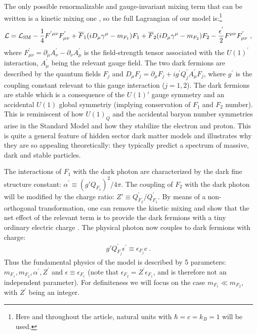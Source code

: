 \documentclass[12pt]{article}
\begin{document}
The only possible renormalizable and gauge-invariant mixing term that can be written is a kinetic mixing one \cite{foothe}, so the full Lagrangian of our model is:\footnote{Here and throughout the article, natural units with $\hbar = c = k _B = 1$ will be used.}
%
\begin{eqnarray}
{\cal L} = {\cal L} _{\text{SM}} -\frac{1}{4}F ^{'\mu \nu} F _{\mu \nu} ^{'} + \overline{F} _1(iD _{\mu}\gamma ^{\mu} - m _{F_1})F _1 + \overline{F} _2(iD _{\mu}\gamma ^{\mu} - m _{F_2})F _2 - \frac{\epsilon ^{'}}{2}F ^{\mu \nu} F _{\mu \nu} ^{'} \ ,
\end{eqnarray}
%
where $F _{\mu \nu} ^{'} = \partial _{\mu} A _{\nu} ^{'} - \partial _{\nu} A _{\mu} ^{'}$ is the field-strength tensor associated with the $U(1) ^{'}$ interaction, $A _{\mu} ^{'}$ being the relevant gauge field. The two dark fermions are described by the quantum fields $F_j$ and $D _{\mu}F _j = \partial _{\mu}F _j + ig ^{'}Q _{j} ^{'} A _{\mu} ^{'}F _j$, where $g ^{'}$ is the coupling constant relevant to this gauge interaction ($j=1,2$). The dark fermions are stable which is a consequence of the $U(1)'$
gauge symmetry and an accidental $U(1)$ global symmetriy  (implying conservation of $F_1$ and $F_2$ number). This is reminiscent of how $U(1)_Q$ and the accidental baryon number  symmetries arise in the Standard Model and how they stabilize the electron and proton. This is quite a general feature of hidden sector dark matter models and illustrates why they are so appealing theoretically: they typically predict a spectrum of massive, dark and stable particles.

The interactions of $F _1$ with the dark photon are characterized by the dark fine structure constant: $\alpha ^{'} \equiv (g'Q _{F_1}) ^2/4\pi$. The coupling of $F _2$ with the dark photon will be modified by the charge ratio: $Z' \equiv Q _{F_2} ^{'}/Q _{F_1} ^{'}$. By means of a non-orthogonal transformation, one can remove the kinetic mixing and show that the net effect of the relevant term is to provide the dark fermions with a tiny ordinary electric charge \cite{holdom}. The physical photon now couples to dark fermions with charge:
%
\begin{eqnarray}
g'Q _{F_j} ^{'} \epsilon ^{'} \equiv \epsilon _{F_j}e \ .
\end{eqnarray}
%
Thus the fundamental physics of the model is described by 5 parameters: $m _{F_1},m _{F_2},\alpha ^{'},Z ^{'}$ and $\epsilon \equiv \epsilon _{F_1}$ (note that $\epsilon _{F_2} = Z ^{'}\epsilon _{F_1}$, and is therefore not an independent parameter). For definiteness we will focus on the case $m _{F_1} \ll m _{F_2}$, with $Z ^{'}$ being an integer.
\end{document}

